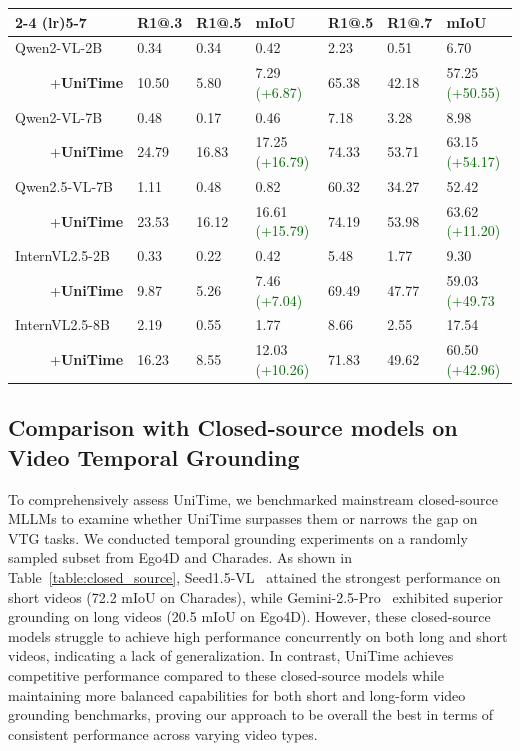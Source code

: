 \begin{table}[t]
\begin{minipage}[t]{0.48\textwidth}
{\begin{tabular}{l *{6}{l}}
    \cmidrule(lr){2-4} \cmidrule(lr){5-7} 
     & R1@.3 & R1@.5 & mIoU & R1@.5 & R1@.7 & mIoU \\
    \midrule
    Qwen2-VL-2B~\cite{wang2024qwen2} & 0.34 & 0.34 & 0.42 & 2.23 & 0.51 & 6.70 \\
    ~~~~~+\textbf{UniTime} & 10.50 & 5.80 & 7.29 \textcolor{darkgreen}{(+6.87)} & 65.38 & 42.18 & 57.25 \textcolor{darkgreen}{(+50.55)} \\
    Qwen2-VL-7B~\cite{wang2024qwen2} & 0.48 & 0.17 & 0.46 & 7.18 & 3.28 & 8.98 \\
    ~~~~~+\textbf{UniTime} & 24.79 & 16.83 & 17.25 \textcolor{darkgreen}{(+16.79)} & 74.33 & 53.71 & 63.15 \textcolor{darkgreen}{(+54.17)} \\
    Qwen2.5-VL-7B~\cite{bai2025qwen2} & 1.11 & 0.48 & 0.82 & 60.32 & 34.27 & 52.42 \\
    ~~~~~+\textbf{UniTime} & 23.53 & 16.12 & 16.61 \textcolor{darkgreen}{(+15.79)} & 74.19 & 53.98 & 63.62 \textcolor{darkgreen}{(+11.20)} \\
    InternVL2.5-2B~\cite{chen2024expanding} & 0.33 & 0.22 & 0.42 & 5.48 & 1.77 & 9.30 \\
    ~~~~~+\textbf{UniTime} & 9.87 & 5.26 & 7.46 \textcolor{darkgreen}{(+7.04)} & 69.49 & 47.77 & 59.03 \textcolor{darkgreen}{(+49.73} \\
    InternVL2.5-8B~\cite{chen2024expanding} & 2.19 & 0.55 & 1.77 & 8.66 & 2.55 & 17.54 \\
    ~~~~~+\textbf{UniTime} & 16.23 & 8.55 & 12.03 \textcolor{darkgreen}{(+10.26)} & 71.83 & 49.62 & 60.50 \textcolor{darkgreen}{(+42.96)} \\
    \bottomrule
    \end{tabular}}
\end{minipage}
\vspace{-15pt}
\end{table}

\subsection{Comparison with Closed-source models on Video Temporal Grounding}

To comprehensively assess UniTime, we benchmarked mainstream closed-source MLLMs to examine whether UniTime surpasses them or narrows the gap on VTG tasks. We conducted temporal grounding experiments on a randomly sampled subset from Ego4D and Charades. As shown in Table~\ref{table:closed_source}, Seed1.5-VL~\cite{seed2025seed1_5vl} attained the strongest performance on short videos (72.2 mIoU on Charades), while Gemini-2.5-Pro~\cite{comanici2025gemini} exhibited superior grounding on long videos (20.5 mIoU on Ego4D). However, these closed-source models struggle to achieve high performance concurrently on both long and short videos, indicating a lack of generalization. In contrast, UniTime achieves competitive performance compared to these closed-source models while maintaining more balanced capabilities for both short and long-form video grounding benchmarks, proving our approach to be overall the best in terms of consistent performance across varying video types.


